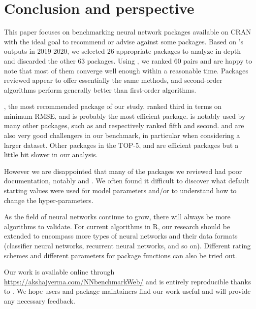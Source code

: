 \hypertarget{conclusion-and-perspective}{%
\section{Conclusion and perspective}\label{conclusion-and-perspective}}

This paper focuses on benchmarking neural network packages available on
CRAN with the ideal goal to recommend or advise against some packages.
Based on 's outputs in 2019-2020, we selected 26
appropriate packages to analyze in-depth and discarded the other 63
packages. Using , we ranked 60
 pairs and are happy to note that most of them
converge well enough within a reasonable time. Packages reviewed appear
to offer essentially the same methods, and second-order algorithms
perform generally better than first-order algorithms.

, the most recommended package of our study, ranked third
in terms on minimum RMSE, and is probably the most efficient package.
 is notably used by many other packages, such as
 and  respectively ranked fifth and
second.  and  are also very good
challengers in our benchmark, in particular when considering a larger
dataset. Other packages in the TOP-5,  and
 are efficient packages but a little bit slower in our
analysis.

However we are disappointed that many of the packages we reviewed had
poor documentation, notably  and .
We often found it difficult to discover what default starting values
were used for model parameters and/or to understand how to change the
hyper-parameters.

As the field of neural networks continue to grow, there will always be
more algorithms to validate. For current algorithms in \textsf{R}, our
research should be extended to encompass more types of neural networks
and their data formats (classifier neural networks, recurrent neural
networks, and so on). Different rating schemes and different parameters
for package functions can also be tried out.

Our work is available online through
\url{https://akshajverma.com/NNbenchmarkWeb/} and is entirely
reproducible thanks to . We hope users and package
maintainers find our work useful and will provide any necessary
feedback.

